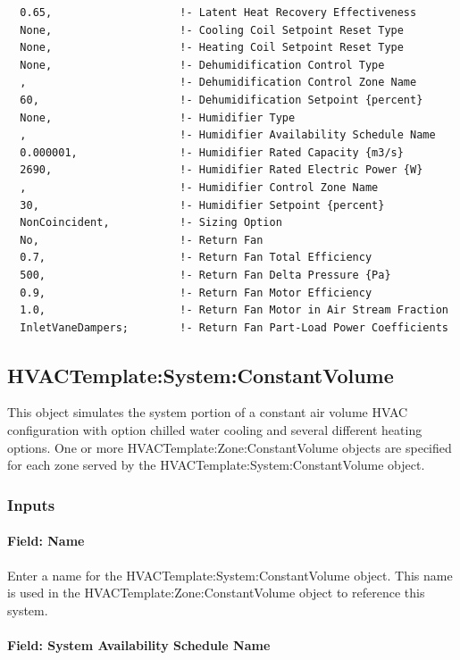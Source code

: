 \begin{lstlisting}
  0.65,                    !- Latent Heat Recovery Effectiveness
  None,                    !- Cooling Coil Setpoint Reset Type
  None,                    !- Heating Coil Setpoint Reset Type
  None,                    !- Dehumidification Control Type
  ,                        !- Dehumidification Control Zone Name
  60,                      !- Dehumidification Setpoint {percent}
  None,                    !- Humidifier Type
  ,                        !- Humidifier Availability Schedule Name
  0.000001,                !- Humidifier Rated Capacity {m3/s}
  2690,                    !- Humidifier Rated Electric Power {W}
  ,                        !- Humidifier Control Zone Name
  30,                      !- Humidifier Setpoint {percent}
  NonCoincident,           !- Sizing Option
  No,                      !- Return Fan
  0.7,                     !- Return Fan Total Efficiency
  500,                     !- Return Fan Delta Pressure {Pa}
  0.9,                     !- Return Fan Motor Efficiency
  1.0,                     !- Return Fan Motor in Air Stream Fraction
  InletVaneDampers;        !- Return Fan Part-Load Power Coefficients
\end{lstlisting}

\subsection{HVACTemplate:System:ConstantVolume}\label{hvactemplatesystemconstantvolume}

This object simulates the system portion of a constant air volume HVAC configuration with option chilled water cooling and several different heating options. One or more HVACTemplate:Zone:ConstantVolume objects are specified for each zone served by the HVACTemplate:System:ConstantVolume object.

\subsubsection{Inputs}\label{inputs-20-002}

\paragraph{Field: Name}\label{field-name-7-007}

Enter a name for the HVACTemplate:System:ConstantVolume object. This name is used in the HVACTemplate:Zone:ConstantVolume object to reference this system.

\paragraph{Field: System Availability Schedule Name}\label{field-system-availability-schedule-name-12}

